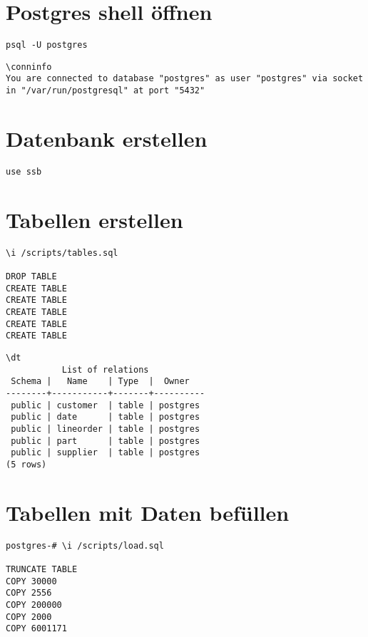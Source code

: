 \section{Postgres shell öffnen}
\begin{lstlisting}[caption=Postgres Shell öffnen, label=code:postgresopen]
psql -U postgres
\end{lstlisting}

\begin{lstlisting}[caption=Verbindungsinformationen, label=code:conninfo]
\conninfo
You are connected to database "postgres" as user "postgres" via socket in "/var/run/postgresql" at port "5432"
\end{lstlisting}

\section{Datenbank erstellen}
\begin{lstlisting}[caption=Datenbank erstellen, label=code:createdb]
use ssb
\end{lstlisting}

\section{Tabellen erstellen}
\begin{lstlisting}[caption=Tabellen erstellen, label=code:createtables]
\i /scripts/tables.sql

DROP TABLE
CREATE TABLE
CREATE TABLE
CREATE TABLE
CREATE TABLE
CREATE TABLE
\end{lstlisting}

\begin{lstlisting}[caption=Liste der Tabellen, label=code:listtables]
\dt
           List of relations
 Schema |   Name    | Type  |  Owner
--------+-----------+-------+----------
 public | customer  | table | postgres
 public | date      | table | postgres
 public | lineorder | table | postgres
 public | part      | table | postgres
 public | supplier  | table | postgres
(5 rows)
\end{lstlisting}

\section{Tabellen mit Daten befüllen}
\begin{lstlisting}[caption=Tabellen mit Daten befüllen, label=code:loaddata]
postgres-# \i /scripts/load.sql

TRUNCATE TABLE
COPY 30000
COPY 2556
COPY 200000
COPY 2000
COPY 6001171
\end{lstlisting}

